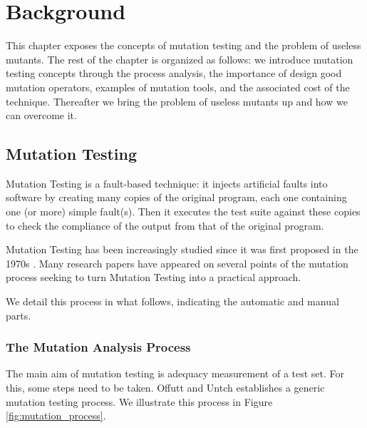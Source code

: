 \chapter{Background}
\label{chp:background}

This chapter exposes the concepts of mutation testing and the problem of useless mutants. 
The rest of the chapter is organized as follows: we introduce mutation testing concepts through the process analysis, the importance of design good mutation operators, examples of mutation tools, and the associated cost of the technique. Thereafter we bring the problem of useless mutants up and how we can overcome it. 

\section{Mutation Testing}
Mutation Testing is a fault-based technique: it injects artificial faults into software by creating many copies of the original program, each one containing one (or more) simple fault(s). 
Then it executes the test suite against these copies to check the compliance of the output from that of the original program. 

Mutation Testing has been increasingly studied since it was first proposed in the 1970s \cite{LIPTON:1971:1, DEMILLO:1978:1}. 
Many research papers have appeared on several points of the mutation process seeking to turn Mutation Testing into a practical approach. 

We detail this process in what follows, indicating the automatic and manual parts.

\subsection{The Mutation Analysis Process}
The main aim of mutation testing is adequacy measurement of a test set. 
For this, some steps need to be taken. 
Offutt and Untch \cite{OFFUTT:2001:1} establishes a generic mutation testing process. We illustrate this process in Figure \ref{fig:mutation_process}. 

